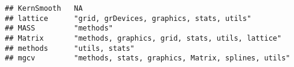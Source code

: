 \documentclass[]{book}
\begin{document}
\begin{verbatim}
## KernSmooth   NA                                                                                                                                                                                                                                                                                                                                                                                                                                                                                                          
## lattice      "grid, grDevices, graphics, stats, utils"                                                                                                                                                                                                                                                                                                                                                                                                                                                                   
## MASS         "methods"                                                                                                                                                                                                                                                                                                                                                                                                                                                                                                   
## Matrix       "methods, graphics, grid, stats, utils, lattice"                                                                                                                                                                                                                                                                                                                                                                                                                                                            
## methods      "utils, stats"                                                                                                                                                                                                                                                                                                                                                                                                                                                                                              
## mgcv         "methods, stats, graphics, Matrix, splines, utils"                                                                                                                                                                                                                                                                                                                                                                                                                                                          

\end{verbatim}
\end{document}
